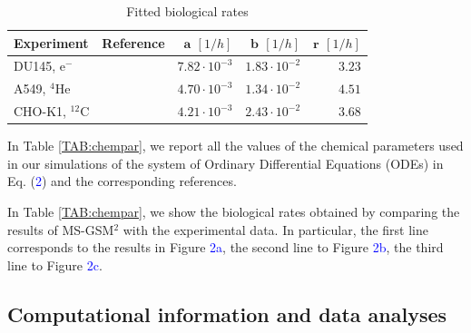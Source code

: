 \documentclass[10pt]{iopart}
\numberwithin{table}{section}
\begin{document}
\begin{table}[h]%
\centering
\caption{Fitted biological rates}\label{TAB:biorates}
\begin{tabular}{llrrr}
\textbf{Experiment} & \textbf{Reference} & $\textbf{a}$ $[1/h]$ & $\textbf{b}$ $[1/h]$ & $\textbf{r}$ $[1/h]$ \\
\midrule
    DU145, e$^-$ & \cite{Adrian2020} & $7.82 \cdot 10^{-3}$ & $1.83 \cdot 10^{-2}$ & $3.23$ \\
    A549, $^4$He & \cite{Tessonnier2021} & $4.70 \cdot 10^{-3}$ & $1.34 \cdot 10^{-2}$ & $4.51$ \\
    CHO-K1, $^{12}$C & \cite{Tinganelliinvitro2022} & $4.21 \cdot 10^{-3}$ & $2.43 \cdot 10^{-2}$ & $3.68$ \\
\bottomrule
\end{tabular}
\end{table}

In Table \ref{TAB:chempar}, we report all the values of the chemical parameters used in our simulations of the system of Ordinary Differential Equations (ODEs) in Eq. (\textcolor{blue}{2}) and the corresponding references.

In Table \ref{TAB:chempar}, we show the biological rates obtained by comparing the results of MS-GSM$^2$ with the experimental data. In particular, the first line corresponds to the results in Figure \textcolor{blue}{2a}, the second line to Figure \textcolor{blue}{2b}, the third line to Figure \textcolor{blue}{2c}. 


\subsection*{Computational information and data analyses}
\end{document}
